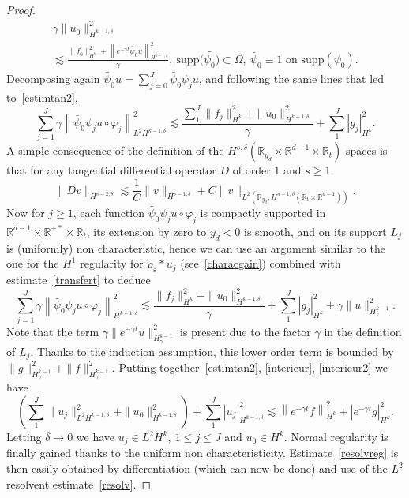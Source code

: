 \documentclass[AHL,Unicode,longabstracts,published]{cedram}
\newcommand{\R}{\mathbb{R}}
\newcommand{\supp}{\mathrm{supp}}
\begin{document}
\begin{proof}
\begin{multline}\label{interieur}
\gamma \|u_0\|_{H^{k-1,\delta}}^2
\\
\lesssim \frac{\|f_0\|_{H^k}^2 +\left\|e^{-\gamma t}\widetilde{\psi_0}u\right\|_{H^{k-1,\delta}}^2}{\gamma},\ \supp(\widetilde{\psi_0)}\subset \Omega,\
\widetilde{\psi_0}\equiv 1\text{ on }
\supp(\psi_0).
\end{multline}
Decomposing again $\widetilde{\psi_0}u =\sum_{j=0}^J \widetilde{\psi_0}\psi_ju$, and following the same lines that led to~\eqref{estimtan2},
\begin{equation}
\sum_{j=1}^J\gamma \left\|\widetilde{\psi_0}
\psi_j u\circ \varphi_j\right\|_{L^2H^{k-1,\delta}}^2 \lesssim
\frac{\sum_1^J\|f_j\|_{H^k}^2+\|u_0\|_{H^{k-1,\delta}}^2}{\gamma}+\sum_1^J|g_j|_{H^k}^2.
\end{equation}
A simple consequence of the definition of the $H^{s,\delta}(\R_{y_d}\times \R^{d-1}\times \R_t)$ spaces is that for any tangential differential operator $D$ of order $1$ and $s\geq 1$
\begin{equation}\label{transfert}
\|Dv\|_{H^{s-2,\delta}}\lesssim
\frac{1}{C}\|v\|_{H^{s-1,\delta}}+C\|v\|_{L^2\left(\R_{y_d},H^{s-1,\delta}\left(\R_t\times \R^{d-1}\right)\right)}.
\end{equation}
Now for $j\geq 1$, each function $\widetilde{\psi_0}\psi_ju\circ \varphi_j$ is compactly supported in $\R^{d-1}\times \R^{+*}\times \R_t$, its extension by zero to $y_d<0$ is smooth, and on its support $L_j$ is (uniformly) non characteristic, hence we can use an argument similar to the one for the $H^1$ regularity for $\rho_\varepsilon*u_j$ (see~\eqref{characgain}) combined with estimate~\eqref{transfert} to deduce
\begin{equation}\label{interieur2}
\sum_{j=1}^J\gamma \left\|\widetilde{\psi_0}
\psi_j u\circ \varphi_j\right\|_{H^{k-1,\delta}}^2
\lesssim
\frac{\|f_j\|_{H^k}^2+\|u_0\|_{H^{k-1,\delta}}^2}{\gamma} +\sum_1^J|g_j|_{H^k}^2 +\gamma \|u\|_{H^{k-1}_\gamma}^2.
\end{equation}
Note that the term $\gamma\|e^{-\gamma t}u\|_{H^{k-1}_\gamma}^2$ is present due to the factor $\gamma$ in the definition of $L_j$. Thanks to the induction assumption, this lower order term is bounded by $\|g\|_{H^{k-1}_\gamma}^2+\|f\|_{H^{k-1}_\gamma}^2$. Putting together~\eqref{estimtan2}, \eqref{interieur}, \eqref{interieur2} we have
\[
\left(\sum_1^J\|u_j\|_{L^2H^{k-1,\delta}}^2+\|u_0\|_{H^{k-1,\delta}}^2\right) +\sum_1^J|u_j|_{H^{k-1,\delta}}^2
\lesssim \left\|e^{-\gamma t}f\right\|_{H^k}^2 +|e^{-\gamma t}g|_{H^k}^2.
\]
Letting $\delta\to 0$ we have $u_j\in L^2H^k,\ 1\leq j\leq J$ and $u_0\in H^k$. Normal regularity is finally gained thanks to the uniform non characteristicity. Estimate~\eqref{resolvreg} is then easily obtained by differentiation (which can now be done) and use of the $L^2$ resolvent estimate~\eqref{resolv}.
\end{proof}
\end{document}
